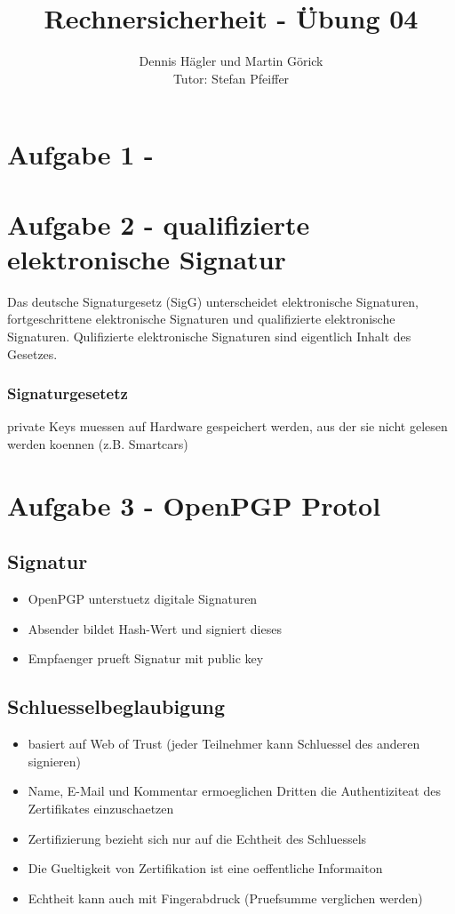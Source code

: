 \documentclass{scrartcl}
\title{Rechnersicherheit - Übung 04}
\author{Dennis Hägler und Martin Görick \\ Tutor: Stefan Pfeiffer}
\begin{document}
\maketitle


\section{Aufgabe 1 - }
\section{Aufgabe 2 - qualifizierte elektronische Signatur}
Das deutsche Signaturgesetz (SigG) unterscheidet elektronische Signaturen,
fortgeschrittene elektronische Signaturen und qualifizierte elektronische
Signaturen. Qulifizierte elektronische Signaturen sind eigentlich Inhalt des
Gesetzes.

\subsubsection{Signaturgesetetz}
\begin{itemize}
\itme private Keys muessen auf Hardware gespeichert werden, aus der sie nicht
gelesen werden koennen (z.B. Smartcars)
\end{itemize}

\section{Aufgabe 3 - OpenPGP Protol}
\subsection{Signatur}
\begin{itemize}
  \item OpenPGP unterstuetz digitale Signaturen
  \item Absender bildet Hash-Wert und signiert dieses
  \item Empfaenger prueft Signatur mit public key
\end{itemize}

\subsection{Schluesselbeglaubigung}
\begin{itemize}
  \item basiert auf Web of Trust (jeder Teilnehmer kann Schluessel des anderen
    signieren)
  \item Name, E-Mail und Kommentar ermoeglichen Dritten die Authentiziteat des
    Zertifikates einzuschaetzen
  \item Zertifizierung bezieht sich nur auf die Echtheit des Schluessels
  \item Die Gueltigkeit von Zertifikation ist eine oeffentliche Informaiton
  \item Echtheit kann auch mit Fingerabdruck (Pruefsumme verglichen werden)
\end{itemize}
\end{document}
